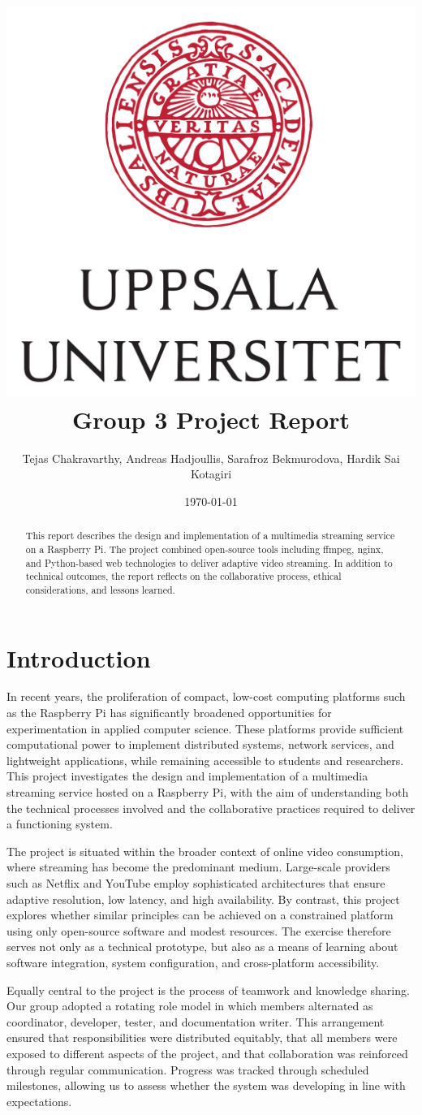\documentclass[11pt]{report}
\title{\includegraphics[scale=0.05]{uu.jpg}\\Group 3 Project Report}
\author{Tejas Chakravarthy, Andreas Hadjoullis, Sarafroz Bekmurodova, Hardik Sai Kotagiri}
\date{\today}
\begin{document}
\maketitle

\begin{abstract}
This report describes the design and implementation of a multimedia streaming service on a Raspberry Pi. The project combined open-source tools including ffmpeg, nginx, and Python-based web technologies to deliver adaptive video streaming. In addition to technical outcomes, the report reflects on the collaborative process, ethical considerations, and lessons learned. 
\end{abstract}

\tableofcontents

\chapter{Introduction}
In recent years, the proliferation of compact, low-cost computing platforms such as the Raspberry Pi has significantly broadened opportunities for experimentation in applied computer science. These platforms provide sufficient computational power to implement distributed systems, network services, and lightweight applications, while remaining accessible to students and researchers. This project investigates the design and implementation of a multimedia streaming service hosted on a Raspberry Pi, with the aim of understanding both the technical processes involved and the collaborative practices required to deliver a functioning system.

The project is situated within the broader context of online video consumption, where streaming has become the predominant medium. Large-scale providers such as Netflix and YouTube employ sophisticated architectures that ensure adaptive resolution, low latency, and high availability. By contrast, this project explores whether similar principles can be achieved on a constrained platform using only open-source software and modest resources. The exercise therefore serves not only as a technical prototype, but also as a means of learning about software integration, system configuration, and cross-platform accessibility.

Equally central to the project is the process of teamwork and knowledge sharing. Our group adopted a rotating role model in which members alternated as coordinator, developer, tester, and documentation writer. This arrangement ensured that responsibilities were distributed equitably, that all members were exposed to different aspects of the project, and that collaboration was reinforced through regular communication. Progress was tracked through scheduled milestones, allowing us to assess whether the system was developing in line with expectations.
\end{document}
